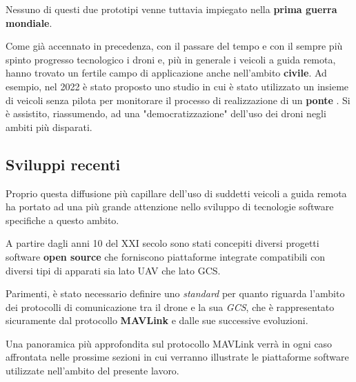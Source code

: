 \documentclass[a4paper, 12pt, oneside]{article}
\begin{document}
Nessuno di questi due prototipi venne tuttavia impiegato nella \textbf{prima guerra mondiale}.

Come già accennato in precedenza, con il passare del tempo e con il sempre più spinto progresso tecnologico i droni e, più in generale i veicoli a guida remota, hanno trovato un fertile campo di applicazione anche nell'ambito \textbf{civile}. Ad esempio, nel 2022 è stato proposto uno studio in cui è stato utilizzato un insieme di veicoli senza pilota per monitorare il processo di realizzazione di un \textbf{ponte} \cite{rs14081858}.
Si è assistito, riassumendo, ad una "democratizzazione" dell'uso dei droni negli ambiti più disparati.

\subsection{Sviluppi recenti}
Proprio questa diffusione più capillare dell'uso di suddetti veicoli a guida remota ha portato ad una più grande attenzione nello sviluppo di tecnologie software specifiche a questo ambito. 

A partire dagli anni 10 del XXI secolo sono stati concepiti diversi progetti software \textbf{open source} che forniscono piattaforme integrate compatibili con diversi tipi di apparati sia lato UAV che lato GCS. 

Parimenti, è stato necessario definire uno \textit{standard} per quanto riguarda l'ambito dei protocolli di comunicazione tra il drone e la sua \textit{GCS}, che è rappresentato sicuramente dal protocollo \textbf{MAVLink} e dalle sue successive evoluzioni. 

Una panoramica più approfondita sul protocollo MAVLink verrà in ogni caso affrontata nelle prossime sezioni in cui verranno illustrate le piattaforme software utilizzate nell'ambito del presente lavoro.

\newpage
\printbibliography[title={Riferimenti bibliografici}]
\end{document}
